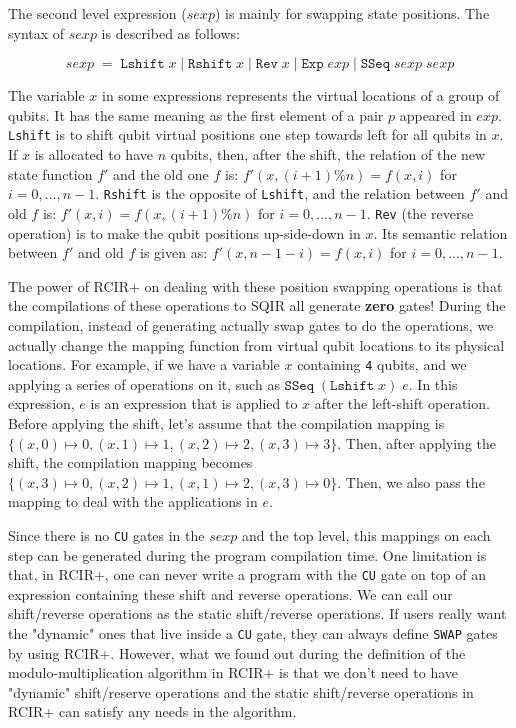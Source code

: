 The second level expression ($sexp$) is mainly for swapping state positions. The syntax of $sexp$ is described as follows:

\[
sexp \;= \;\texttt{Lshift}\;x \;|\; \texttt{Rshift}\;x \;|\;\texttt{Rev}\;x 
                 \;|\; \texttt{Exp}\; exp \;|\; \texttt{SSeq} \;sexp\; sexp
\]

The variable $x$ in some expressions represents the virtual locations of a group of qubits. It has the same meaning as the first element of a pair $p$ appeared in $exp$. \texttt{Lshift} is to shift qubit virtual positions one step towards left for all qubits in $x$. If $x$ is allocated to have $n$ qubits, then, after the shift, the relation of the new state function $f'$ and the old one $f$ is: $f'(x,(i+1) \% n) = f(x,i)$ for $i=0,...,n-1$. \texttt{Rshift} is the opposite of \texttt{Lshift}, and the relation between $f'$ and old $f$ is: $f'(x,i) = f(x,(i+1)\%n)$ for $i=0,...,n-1$. \texttt{Rev} (the reverse operation) is to make the qubit positions up-side-down in $x$. Its semantic relation between $f'$ and old $f$ is given as: $f'(x,n-1-i) = f(x,i)$ for $i=0,...,n-1$.

The power of RCIR+ on dealing with these position swapping operations is that the compilations of these operations to SQIR all generate \textbf{zero} gates! During the compilation, instead of generating actually swap gates to do the operations, we actually change the mapping function from virtual qubit locations to its physical locations. For example, if we have a variable $x$ containing \texttt{4} qubits, and we applying a series of operations on it, such as $\texttt{SSeq}\;(\texttt{Lshift}\;x)\;e$. In this expression, $e$ is an expression that is applied to $x$ after the left-shift operation. Before applying the shift, let's assume that the compilation mapping is $\{(x,0) \mapsto 0, (x,1) \mapsto 1, (x,2) \mapsto 2, (x,3) \mapsto 3\}$. Then, after applying the shift, the compilation mapping becomes  $\{(x,3) \mapsto 0, (x,2) \mapsto 1, (x,1) \mapsto 2,(x,3) \mapsto 0\}$. Then, we also pass the mapping to deal with the applications in $e$. 

Since there is no \texttt{CU} gates in the $sexp$ and the top level, this mappings on each step can be generated during the program compilation time. One limitation is that, in RCIR+, one can never write a program with the \texttt{CU} gate on top of an expression containing these shift and reverse operations. We can call our shift/reverse operations as the static shift/reverse operations. If users really want the "dynamic" ones that live inside a \texttt{CU} gate, they can always define \texttt{SWAP} gates by using RCIR+. However, what we found out during the definition of the modulo-multiplication algorithm in RCIR+ is that we don't need to have "dynamic" shift/reserve operations and the static shift/reverse operations in RCIR+ can satisfy any needs in the algorithm. 

